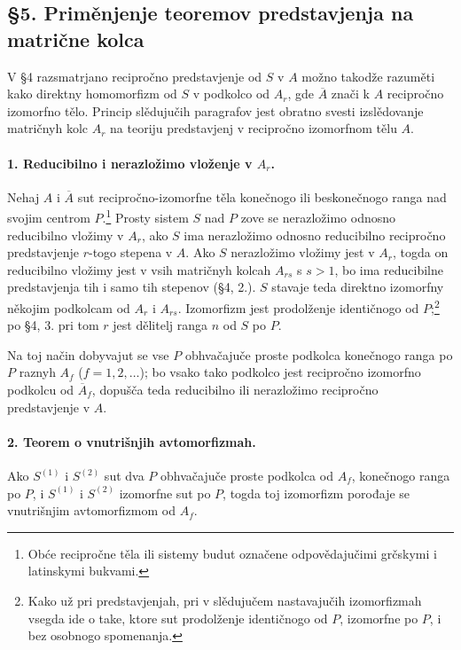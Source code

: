 \documentclass[11pt]{article}
\begin{document}
\subsection*{§5. Priměnjenje teoremov predstavjenja na matrične kolca}

V §4 razsmatrjano recipročno predstavjenje od \(S\) v \(A\) možno takodže razuměti kako direktny homomorfizm od \(S\) v podkolco od \(A_r\), gde \(\overline A\) znači k \(A\) recipročno izomorfno tělo. Princip slědujučih paragrafov jest obratno svesti izslědovanje matričnyh kolc \(A_r\) na teoriju predstavjenj v recipročno izomorfnom tělu \(A\).

\paragraph{1. Reducibilno i nerazložimo vloženje v \(A_r\).}
Nehaj \(A\) i \(\overline A\) sut recipročno-izomorfne těla konečnogo ili beskonečnogo ranga nad svojim centrom \(P\).\footnote{Obće recipročne těla ili sistemy budut označene odpovědajučimi grčskymi i latinskymi bukvami.} Prosty sistem \(S\) nad \(P\) zove se nerazložimo odnosno reducibilno vložimy v \(A_r\), ako \(S\) ima nerazložimo odnosno reducibilno recipročno predstavjenje \(r\)-togo stepena v \(A\). Ako \(S\) nerazložimo vložimy jest v \(A_r\), togda on reducibilno vložimy jest v vsih matričnyh kolcah \(A_{rs}\) s \(s>1\), bo ima reducibilne predstavjenja tih i samo tih stepenov (§4, 2.). \(S\) stavaje teda direktno izomorfny někojim podkolcam od \(A_r\) i \(A_{rs}\). Izomorfizm jest prodolženje identičnogo od \(P\);\footnote{Kako už pri predstavjenjah, pri v slědujučem nastavajučih izomorfizmah vsegda ide o take, ktore sut prodolženje identičnogo od \(P\), izomorfne po \(P\), i bez osobnogo spomenanja.} po §4, 3. pri tom \(r\) jest dělitelj ranga \(n\) od \(S\) po \(P\).

Na toj način dobyvajut se vse \(P\) obhvačajuče proste podkolca konečnogo ranga po \(P\) raznyh \(A_f\) (\(f=1,2,\ldots\)); bo vsako tako podkolco jest recipročno izomorfno podkolcu od \(\overline A_f\), dopušča teda reducibilno ili nerazložimo recipročno predstavjenje v \(A\).

\paragraph{2. Teorem o vnutrišnjih avtomorfizmah.}
Ako \(S^{(1)}\) i \(S^{(2)}\) sut dva \(P\) obhvačajuče proste podkolca od \(A_f\), konečnogo ranga po \(P\), i \(S^{(1)}\) i \(S^{(2)}\) izomorfne sut po \(P\), togda toj izomorfizm porođaje se vnutrišnjim avtomorfizmom od \(A_f\).
\end{document}
